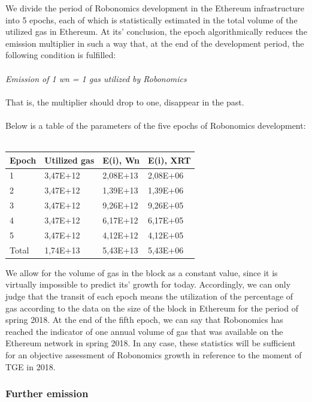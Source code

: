 \documentclass{article}
\begin{document}
We divide the period of Robonomics development in the Ethereum infrastructure into 5 epochs, each of which is statistically estimated in the total volume of the utilized gas in Ethereum. At its’ conclusion, the epoch algorithmically reduces the emission multiplier in such a way that, at the end of the development period, the following condition is fulfilled:
\\
\\
\textit{Emission of 1 wn = 1 gas utilized by Robonomics}
\\
\\
That is, the multiplier should drop to one, disappear in the past.
\\
\\
Below is a table of the parameters of the five epochs of Robonomics development:
\\
\\
\begin{tabular}{ |l |l |l |l}
 \textbf{Epoch} & \textbf{Utilized gas} & \textbf{E(i), Wn} & \textbf{E(i), XRT} \\ 
 \hline
 1 &  3,47E+12 & 2,08E+13 & 2,08E+06 \\ 
 2 &  3,47E+12 & 1,39E+13 & 1,39E+06 \\ 
 3 &  3,47E+12 & 9,26E+12 & 9,26E+05 \\ 
 4 &  3,47E+12 & 6,17E+12 & 6,17E+05 \\ 
 5 &  3,47E+12 & 4,12E+12 & 4,12E+05 \\ 
 Total &  1,74E+13 & 5,43E+13 & 5,43E+06 \\ 
\end{tabular}

We allow for the volume of gas in the block as a constant value, since it is virtually impossible to predict its’ growth for today. Accordingly, we can only judge that the transit of each epoch means the utilization of the percentage of gas according to the data on the size of the block in Ethereum for the period of spring 2018. At the end of the fifth epoch, we can say that Robonomics has reached the indicator of one annual volume of gas that was available on the Ethereum network in spring 2018. In any case, these statistics will be sufficient for an objective assessment of Robonomics growth in reference to the moment of TGE in 2018.

\subsubsection{Further emission}
\end{document}
